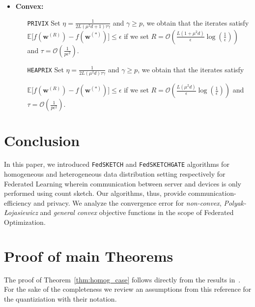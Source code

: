 \documentclass[review,onefignum,onetabnum]{siamart190516}
\newcommand{\pl}{Polyak-\L{}ojasiewicz}
\begin{document}
\begin{theorem}
\begin{itemize}
     \item \textbf{Convex:}
     \begin{itemize}
         \item [\texttt{PRIVIX}] Set $\eta=\frac{1}{2L\left(\mu^2d+1\right)\tau\gamma}$ and $\gamma\geq p$, we obtain that the iterates satisfy $ \mathbb{E}\Big[f({\boldsymbol{w}}^{(R)})-f({\boldsymbol{w}}^{(*)})\Big]\leq \epsilon$ if we set
     $R=\mathcal{O}\left(\frac{L\left(1+\mu^2d\right)}{\epsilon}\log\left(\frac{1}{\epsilon}\right)\right)$ and $ \tau=\mathcal{O}\left(\frac{1}{p\epsilon^2}\right).$
         \item [\texttt{HEAPRIX}] Set  $\eta=\frac{1}{2L\left(\mu^2d\right)\tau\gamma}$ and $\gamma\geq p$, we obtain that the iterates satisfy 
         
         $ \mathbb{E}\Big[f({\boldsymbol{w}}^{(R)})-f({\boldsymbol{w}}^{(*)})\Big]\leq \epsilon$ if we set
     $R=\mathcal{O}\left(\frac{L\left(\mu^2d\right)}{\epsilon}\log\left(\frac{1}{\epsilon}\right)\right)$ and $ \tau=\mathcal{O}\left(\frac{1}{p\epsilon^2}\right).$ 
     \end{itemize}
 \end{itemize}
\end{theorem}

\section{Conclusion}\label{sec:conclusion}
In this paper, we introduced \texttt{FedSKETCH} and \texttt{FedSKETCHGATE} algorithms for homogeneous and heterogeneous data distribution setting respectively for Federated Learning wherein communication between server and devices is only performed using count sketch. 
Our algorithms, thus, provide communication-efficiency and privacy. 
We analyze the convergence error for \emph{non-convex}, \emph{\pl} and \emph{general convex} objective functions in the scope of Federated Optimization.     



\newpage



\newpage

\appendix
\section{Proof of main Theorems}
The proof of Theorem~\ref{thm:homog_case} follows directly from the results in~\cite{haddadpour2020federated}. For the sake of the completeness we review an assumptions from this reference for the quantiziation with their notation.
\end{document}
